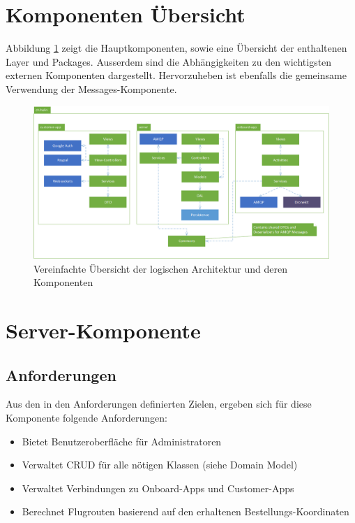 \section{Komponenten Übersicht}

Abbildung \ref{fig:logical-architecture-overview} zeigt die Hauptkomponenten, sowie eine Übersicht der enthaltenen Layer und Packages. Ausserdem sind die Abhängigkeiten zu den wichtigsten externen Komponenten dargestellt. Hervorzuheben ist ebenfalls die gemeinsame Verwendung der Messages-Komponente. 

\begin{figure}[h]
	\includegraphics[width=1.0\textwidth]{images/logical-architecture-overview.png}
	\caption{Vereinfachte Übersicht der logischen Architektur und deren Komponenten }
	\label{fig:logical-architecture-overview}
\end{figure}

\section{Server-Komponente}

\subsection{Anforderungen}

Aus den in den Anforderungen definierten Zielen, ergeben sich für diese Komponente folgende Anforderungen:

\begin{itemize}
	\item Bietet Benutzeroberfläche für Administratoren
	\item Verwaltet CRUD für alle nötigen Klassen (siehe Domain Model)
	\item Verwaltet Verbindungen zu Onboard-Apps und Customer-Apps
	\item Berechnet Flugrouten basierend auf den erhaltenen Bestellungs-Koordinaten
\end{itemize}

